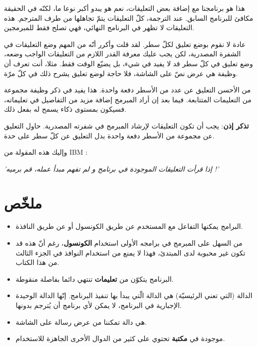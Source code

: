 هذا هو برنامجنا مع إضافة بعض التعليقات، نعم هو يبدو أكبر نوعا ما، لكنّه في الحقيقة مكافئ للبرنامج السابق. عند الترجمة، كلّ التعليقات يتمّ تجاهلها من طرف المترجم. هذه التعليقات لا تظهر في البرنامج النهائي، فهي تصلح فقط للمبرمجين.

عادة لا نقوم بوضع تعليق لكلّ سطر. لقد قلت وأكرر أنّه من المهم وضع التعليقات في الشفرة المصدرية، لكن يجب عليك معرفة القدر اللازم من التعليقات الواجب وضعه، وضع تعليق في كلّ سطر قد لا يفيد في شيء، بل يضيّع الوقت فقط. مثلا، أنت تعرف أن وظيفة
هي عرض نصّ على الشاشة، فلا حاجة لوضع تعليق يشرح ذلك في كلّ مرّة.

من الأحسن التعليق عن عدد من الأسطر دفعة واحدة. هذا يفيد في ذكر وظيفة مجموعة من التعليمات المتتابعة. فيما بعد إن أراد المبرمج إضافة مزيد من التفاصيل في تعليماته، فسيكون بمستوى ذكاء يسمح له بفعل ذلك.

\textbf{تذكر إذن}:
يجب أن تكون التعليقات لإرشاد المبرمج في شفرته المصدرية. حاول التعليق عن مجموعة من الأسطر دفعة واحدة بدل التعليق عن كلّ سطر على حدة.

وإليك هذه المقولة من
\textenglish{IBM} :

\begin{center}
  \itshape\Large
  'إذا قرأت التعليقات الموجودة في برنامج و لم تفهم مبدأ عمله، قم برميه !'
\end{center}

\section*{ملخّص}

\begin{itemize}
  \item البرامج يمكنها التفاعل مع المستخدم عن طريق الكونسول أو عن طريق النافذة.
  \item من السهل على المبرمج في برامجه الأولى استخدام
\textbf{الكونسول}،
رغم أنّ هذه قد تكون غير محبوبة لدى المبتدئ، فهذا لا يمنع من استخدام النوافذ في الجزء الثالث من هذا الكتاب.
  \item البرنامج يتكوّن من
\textbf{تعليمات}
 تنتهي دائما بفاصلة منقوطة.
  \item الدالة
 (التي تعني الرئيسيّة) هي الدالة الّتي يبدأ بها تنفيذ البرنامج. إنّها الدالة الوحيدة الإجبارية في البرنامج، لا يمكن لأي برنامج أن يُترجم بدونها.
 \item {}
 هي دالة تمكننا من عرض رسالة على الشاشة.
 \item {}
موجودة في
\textbf{مكتبة}
 تحتوي على كثير من الدوال الأخرى الجاهزة للاستخدام.
\end{itemize}

